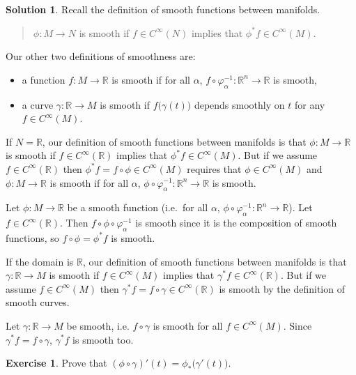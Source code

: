 \documentclass[11pt, a4paper]{report}
\theoremstyle{definition}
\newtheorem{exercise}{Exercise}[part]
\newtheorem{solution}{Solution}[part]
\newenvironment{ex}{\begin{exercise}}{\end{exercise}\pagebreak[1]}
\newenvironment{sol}{\begin{solution}}{\end{solution}\pagebreak[3]}
\begin{document}
\begin{sol}

Recall the definition of smooth functions between manifolds.

\begin{quote}
    $\phi: M \to N$ is smooth if $f \in C^\infty(N)$ implies that $\phi^* f \in C^\infty(M)$.
\end{quote}

Our other two definitions of smoothness are:
\begin{itemize}
    \item a function $f: M \to \mathbb{R}$ is smooth if for all $\alpha$, $f \circ \varphi_\alpha^{-1}: \mathbb{R}^n \to \mathbb{R}$ is smooth,
    \item a curve $\gamma: \mathbb{R} \to M$ is smooth if $f \bigl( \gamma(t) \bigr)$ depends smoothly on $t$ for any $f \in C^\infty(M)$.
\end{itemize}

If $N = \mathbb{R}$, our definition of smooth functions between manifolds is that $\phi: M \to \mathbb{R}$ is smooth if $f \in C^\infty(\mathbb{R})$ implies that $\phi^* f \in C^\infty(M)$.
But if we assume $f \in C^\infty(\mathbb{R})$ then $\phi^* f = f \circ \phi \in C^\infty(M)$ requires that $\phi \in C^\infty(M)$ and $\phi: M \to \mathbb{R}$ is smooth if for all $\alpha$, $\phi \circ \varphi_\alpha^{-1}: \mathbb{R}^n \to \mathbb{R}$ is smooth.

Let $\phi: M \to \mathbb{R}$ be a smooth function (i.e.\ for all $\alpha$, $\phi \circ \varphi_\alpha^{-1}: \mathbb{R}^n \to \mathbb{R}$).
Let $f \in C^\infty(\mathbb{R})$.
Then $f \circ \phi \circ \varphi_\alpha^{-1}$ is smooth since it is the composition of smooth functions, so $f \circ \phi = \phi^* f$ is smooth.

If the domain is $\mathbb{R}$, our definition of smooth functions between manifolds is that $\gamma: \mathbb{R} \to M$ is smooth if $f \in C^\infty(M)$ implies that $\gamma^* f \in C^\infty(\mathbb{R})$.
But if we assume $f \in C^\infty(M)$ then $\gamma^* f = f \circ \gamma \in C^\infty(\mathbb{R})$ is smooth by the definition of smooth curves.

Let $\gamma: \mathbb{R} \to M$ be smooth, i.e. $f\circ \gamma$ is smooth for all $f \in C^\infty(M)$.
Since $\gamma^* f = f \circ \gamma$, $\gamma^* f$ is smooth too.

\end{sol}

\begin{ex}

Prove that $(\phi \circ \gamma)'(t) = \phi_* \bigl( \gamma'(t) \bigr)$.

\end{ex}
\end{document}
